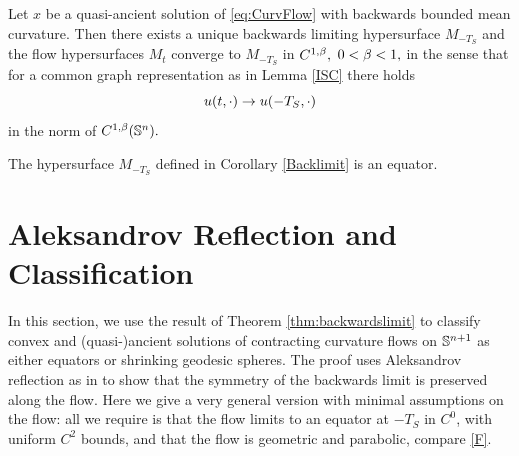 \documentclass{amsart}
\begin{document}
\begin{cor}\label{Backlimit}
Let $x$ be a quasi-ancient solution of \eqref{eq:CurvFlow} with backwards bounded mean curvature. Then there exists a unique backwards limiting hypersurface $M_{-T_S}$ and the flow hypersurfaces $M_t$ converge to $M_{-T_S}$ in $C^{1,\b},$ $0<\b<1,$ in the sense that for a common graph representation as in Lemma \ref{ISC} there holds
$$u(t,\cdot)\ra u(-T_S,\cdot)$$
in the norm of $C^{1,\b}(\S^n).$
\end{cor}
\begin{thm}
\label{thm:backwardslimit}
The hypersurface $M_{-T_S}$ defined in Corollary \ref{Backlimit} is an equator.
\end{thm}
\section{Aleksandrov Reflection and Classification}\label{sec:reflection}
In this section, we use the result of Theorem \ref{thm:backwardslimit} to classify convex and (quasi-)ancient solutions of contracting curvature flows on \(\S^{n+1}\) as either equators or shrinking geodesic spheres. The proof uses Aleksandrov reflection as in \cite{BryanIvaki:08/2015, BryanLouie:04/2016} to show that the symmetry of the backwards limit is preserved along the flow. Here we give a very general version with minimal assumptions on the flow: all we require is that the flow limits to an equator at $-T_S$ in \(C^0\), with uniform \(C^2\) bounds, and that the flow is geometric and parabolic, compare \cref{F}.
\end{document}
